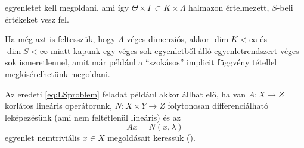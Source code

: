\documentclass[oneside, titlepage, 12pt, a4paper]{report}
\begin{document}
egyenletet kell megoldani, ami így $\Theta \times \Gamma \subset K \times \Lambda$ halmazon értelmezett, $S$-beli értékeket vesz fel. \par
Ha még azt is feltesszük, hogy $\Lambda$ véges dimenziós, akkor $\dim K < \infty$ és $\dim S < \infty$ miatt kapunk egy véges sok egyenletből álló egyenletrendszert véges sok ismeretlennel, amit már például a ``szokásos'' implicit függvény tétellel megkísérelhetünk megoldani. \par
Az eredeti \ref{eq:LSproblem} feladat például akkor állhat elő, ha van $A : X \rightarrow Z$ korlátos lineáris operátorunk, $N : X \times Y \rightarrow Z$ folytonosan differenciálható leképezésünk (ami nem feltétlenül lineáris) és az
\begin{equation*}
Ax = N(x, \lambda)
\end{equation*}
egyenlet nemtriviális $x \in X$ megoldásait keressük (\cite{8.6TLSM}).


\end{document}
